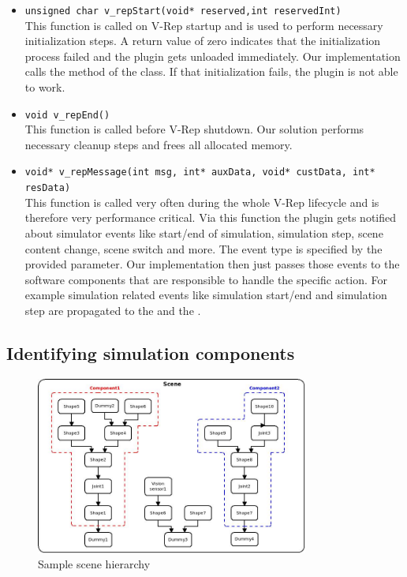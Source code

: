\begin{itemize}

\item \texttt{unsigned char v\_repStart(void* reserved,int reservedInt)} \\
This function is called on V-Rep startup and is used to perform necessary initialization steps. A return value of zero indicates that the initialization process failed and the plugin gets unloaded immediately.
Our implementation calls the  method of the  class. If that initialization fails, the plugin is not able to work.

\item \texttt{void v\_repEnd()} \\
This function is called before V-Rep shutdown. Our solution performs necessary cleanup steps and frees all allocated memory.

\item \texttt{void* v\_repMessage(int msg, int* auxData, void* custData, int* resData)} \\
This function is called very often during the whole V-Rep lifecycle and is therefore very performance critical. Via this function the plugin gets notified about simulator events like start/end of simulation, simulation step, scene content change, scene switch and more. The event type is specified by the provided  parameter. Our implementation then just passes those events to the software components that are responsible to handle the specific action. For example simulation related events like simulation start/end and simulation step are propagated to the  and the .
  
\end{itemize}

\subsection{Identifying simulation components}
\label{sec:comp_id}

\begin{figure}[h]
	\centering
  	\includegraphics[width=0.8\textwidth]{images/scene_hierarchy.jpg}
	\caption{Sample scene hierarchy}
	\label{fig:scene_tree}
\end{figure}

